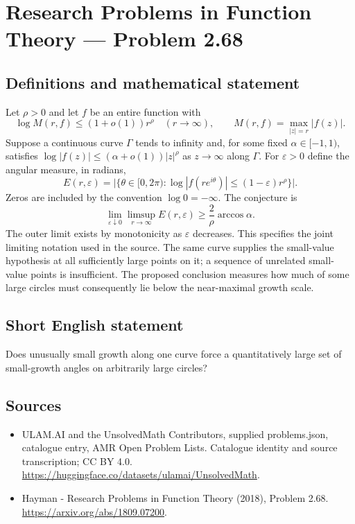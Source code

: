 \documentclass[11pt,a4paper]{article}
\begin{document}
\section*{Research Problems in Function Theory — Problem 2.68}\label{statement}

\subsection{Definitions and mathematical statement}
Let $\rho>0$ and let $f$ be an entire function with
\[
\log M(r,f)\le(1+o(1))r^\rho\quad(r\to\infty),
\qquad M(r,f)=\max_{|z|=r}|f(z)|.
\]
Suppose a continuous curve $\Gamma$ tends to infinity and, for some fixed $\alpha\in[-1,1)$, satisfies
$\log|f(z)|\le(\alpha+o(1))|z|^\rho$ as $z\to\infty$ along $\Gamma$.
For $\varepsilon>0$ define the angular measure, in radians,
\[
E(r,\varepsilon)=\bigl|\{\theta\in[0,2\pi):
\log|f(re^{i\theta})|\le(1-\varepsilon)r^\rho\}\bigr|.
\]
Zeros are included by the convention $\log0=-\infty$. The conjecture is
\[
\lim_{\varepsilon\downarrow0}\limsup_{r\to\infty}E(r,\varepsilon)
\ge \frac2\rho\arccos\alpha.
\]
The outer limit exists by monotonicity as $\varepsilon$ decreases. This specifies the joint limiting notation used in the source. The same curve supplies the small-value hypothesis at all sufficiently large points on it; a sequence of unrelated small-value points is insufficient. The proposed conclusion measures how much of some large circles must consequently lie below the near-maximal growth scale.
\subsection{Short English statement}
Does unusually small growth along one curve force a quantitatively large set of small-growth angles on arbitrarily large circles?
\subsection{Sources}
\begin{itemize}
\item[S1] ULAM.AI and the UnsolvedMath Contributors, supplied problems.json, catalogue entry, AMR Open Problem Lists. Catalogue identity and source transcription; CC BY 4.0.
\url{https://huggingface.co/datasets/ulamai/UnsolvedMath}.
\item[S2] Hayman - Research Problems in Function Theory (2018), Problem 2.68. 
\url{https://arxiv.org/abs/1809.07200}.
\end{itemize}
\end{document}
